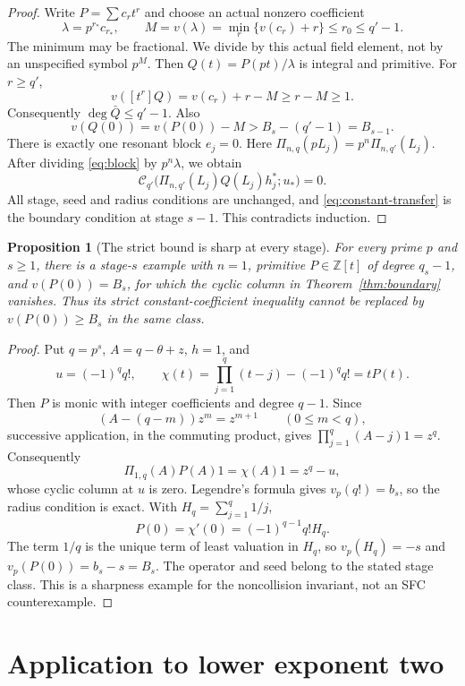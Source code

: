 \documentclass[11pt]{article}
\newtheorem{proposition}[lemma]{Proposition}
\begin{document}
\begin{proof}
Write $P=\sum c_rt^r$ and choose an actual nonzero coefficient
\[
 \lambda=p^{r_*}c_{r_*},\qquad
 M=v(\lambda)=\min_r\{v(c_r)+r\}\le r_0\le q'-1.
\]
The minimum may be fractional. We divide by this actual field element,
not by an unspecified symbol $p^M$.
Then $Q(t)=P(pt)/\lambda$ is integral and primitive.
For $r\ge q'$,
\[
 v([t^r]Q)=v(c_r)+r-M\ge r-M\ge1.
\]
Consequently $\deg\bar Q\le q'-1$. Also
\[
 v(Q(0))=v(P(0))-M
 >B_s-(q'-1)=B_{s-1}.                                  \tag{3}\label{eq:constant-transfer}
\]
There is exactly one resonant block $e_j=0$.
Here $\Pi_{n,q}(pL_j)=p^n\Pi_{n,q'}(L_j)$.
After dividing \eqref{eq:block} by $p^n\lambda$, we obtain
\[
 \mathcal C_{q'}\bigl(
       \Pi_{n,q'}(L_j)Q(L_j)h_j^*;u_*\bigr)=0.
\]
All stage, seed and radius conditions are unchanged, and
\eqref{eq:constant-transfer} is the boundary condition at stage $s-1$.
This contradicts induction.
\end{proof}

\begin{proposition}[The strict bound is sharp at every stage]
\label{prop:sharpness}
For every prime $p$ and $s\ge1$, there is a stage-$s$ example
with $n=1$, primitive $P\in\mathbb Z[t]$ of degree $q_s-1$,
and $v(P(0))=B_s$, for which the cyclic column in
Theorem~\ref{thm:boundary} vanishes.
Thus its strict constant-coefficient inequality cannot be replaced
by $v(P(0))\ge B_s$ in the same class.
\end{proposition}
\begin{proof}
Put $q=p^s$, $A=q-\theta+z$, $h=1$, and
\[
 u=(-1)^q q!,\qquad
 \chi(t)=\prod_{j=1}^{q}(t-j)-(-1)^q q!=tP(t).
\]
Then $P$ is monic with integer coefficients and degree $q-1$.
Since
\[
 (A-(q-m))z^m=z^{m+1}\qquad(0\le m<q),
\]
successive application, in the commuting product, gives
$\prod_{j=1}^{q}(A-j)1=z^q$.
Consequently
\[
 \Pi_{1,q}(A)P(A)1=\chi(A)1=z^q-u,
\]
whose cyclic column at $u$ is zero.
Legendre's formula gives $v_p(q!)=b_s$, so the radius condition
is exact. With $H_q=\sum_{j=1}^{q}1/j$,
\[
 P(0)=\chi'(0)=(-1)^{q-1}q!H_q.
\]
The term $1/q$ is the unique term of least valuation in $H_q$,
so $v_p(H_q)=-s$ and $v_p(P(0))=b_s-s=B_s$.
The operator and seed belong to the stated stage class.
This is a sharpness example for the noncollision invariant,
not an SFC counterexample.
\end{proof}

\section{Application to lower exponent two}
\end{document}
